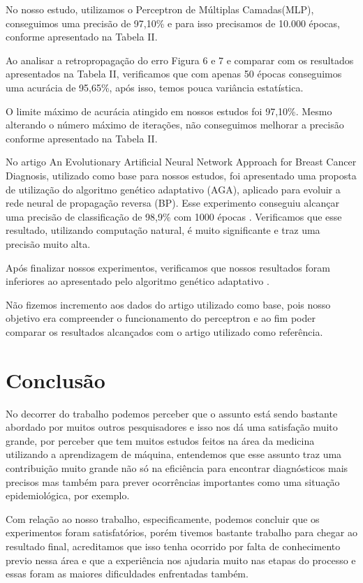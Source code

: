 \documentclass[conference]{IEEEtran}
\begin{document}
    No nosso estudo, utilizamos o Perceptron de Múltiplas Camadas(MLP), conseguimos uma precisão de 97,10\% e para isso precisamos de 10.000 épocas, conforme apresentado na Tabela II.
    
    Ao analisar a retropropagação do erro Figura 6 e 7 e comparar com os resultados apresentados na Tabela II, verificamos que com apenas 50 épocas conseguimos uma acurácia de 95,65\%, após isso, temos pouca variância estatística.
    
    O limite máximo de acurácia atingido em nossos estudos foi 97,10\%. Mesmo alterando o número máximo de iterações, não conseguimos melhorar a precisão conforme apresentado na Tabela II.

    No artigo An Evolutionary Artificial Neural Network Approach for Breast Cancer Diagnosis, utilizado como base para nossos estudos, foi apresentado uma proposta de utilização do algoritmo genético adaptativo (AGA), aplicado para evoluir a rede neural de propagação reversa (BP). Esse experimento conseguiu alcançar uma precisão de classificação de 98,9\% com 1000 épocas \cite{b1}. Verificamos que esse resultado, utilizando computação natural, é muito significante e traz uma precisão muito alta. 

    Após finalizar nossos experimentos, verificamos que nossos resultados foram inferiores ao apresentado pelo algoritmo genético adaptativo \cite{b1}.
    
    Não fizemos incremento aos dados do artigo utilizado como base, pois nosso objetivo era compreender o funcionamento do perceptron e ao fim poder comparar os resultados alcançados com o artigo utilizado como referência.
    
    
\section*{Conclusão}

  No decorrer do trabalho podemos perceber que o assunto está sendo bastante abordado por muitos outros pesquisadores e isso nos dá uma satisfação muito grande, por perceber que tem muitos estudos feitos na área da medicina utilizando a aprendizagem de máquina, entendemos que esse assunto traz uma contribuição muito grande não só na eficiência para encontrar diagnósticos mais precisos mas também para prever ocorrências importantes como uma situação epidemiológica, por exemplo.
  
  Com relação ao nosso trabalho, especificamente, podemos concluir que os experimentos foram satisfatórios, porém tivemos bastante trabalho para chegar ao resultado final, acreditamos que isso tenha ocorrido por falta de conhecimento previo nessa área e que a experiência nos ajudaria muito nas etapas do processo e essas foram as maiores dificuldades enfrentadas também.
  
\end{document}
